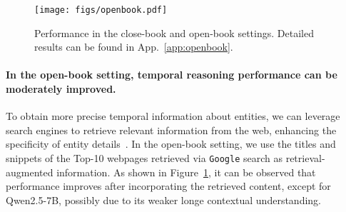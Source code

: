 \begin{figure}[t]
    \centering
\texttt{[image: figs/openbook.pdf]}
    \caption{Performance in the close-book and open-book settings. Detailed results can be found in App.~\ref{app:openbook}.
    }
    \label{fig:openbook}
\end{figure}

\paragraph{In the open-book setting, temporal reasoning performance can be moderately improved.}
To obtain more precise temporal information about entities, we can leverage search engines to retrieve relevant information from the web, enhancing the specificity of entity details~\cite{wu2025webwalker}.
In the open-book setting, we use the titles and snippets of the Top-10 webpages retrieved via \texttt{Google} search as retrieval-augmented information.
As shown in Figure~\ref{fig:openbook}, it can be observed that performance improves after incorporating the retrieved content, except for Qwen2.5-7B, possibly due to its weaker longe contextual understanding.
